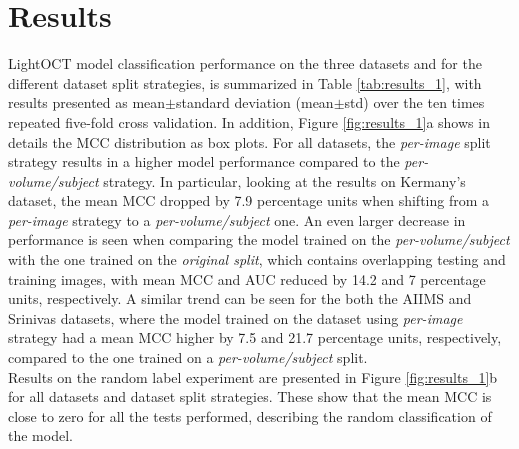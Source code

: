 \documentclass[fleqn,10pt]{wlscirep}
\begin{document}
\section*{Results}
LightOCT model classification performance on the three datasets and for the different dataset split strategies, is summarized in Table \ref{tab:results_1}, with results presented as mean$\pm$standard deviation (mean$\pm$std) over the ten times repeated five-fold cross validation.  In addition, Figure \ref{fig:results_1}a shows in details the MCC distribution as box plots.  For all datasets, the \textit{per-image} split strategy results in a higher model performance compared to the \textit{per-volume/subject} strategy.  In particular, looking at the results on Kermany’s dataset, the mean MCC dropped by 7.9 percentage units when shifting from a \textit{per-image} strategy to a \textit{per-volume/subject} one.  An even larger decrease in performance is seen when comparing the model trained on the \textit{per-volume/subject} with the one trained on the \textit{original split},  which contains overlapping testing and training images,  with mean MCC and AUC reduced by 14.2 and 7 percentage units,  respectively.  A similar trend can be seen for the both the AIIMS and Srinivas datasets,  where the model trained on the dataset using \textit{per-image} strategy had a mean MCC higher by 7.5 and 21.7 percentage units, respectively,  compared to the one trained on a \textit{per-volume/subject} split.  \\
Results on the random label experiment are presented in Figure \ref{fig:results_1}b for all datasets and dataset split strategies.  These show that the mean MCC is close to zero for all the tests performed, describing the random classification of the model.
\end{document}

